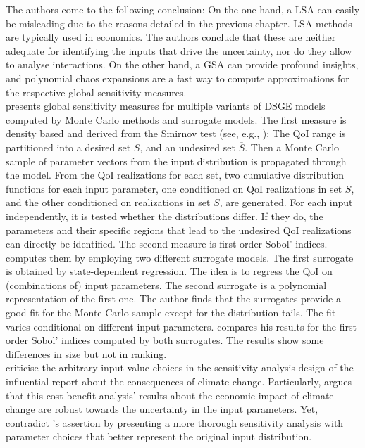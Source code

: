\documentclass[a4paper,12pt]{article}
\begin{document}
The authors come to the following conclusion: On the one hand, a LSA can easily be misleading due to the reasons detailed in the previous chapter. LSA methods are typically used in economics. The authors conclude that these are neither adequate for identifying the inputs that drive the uncertainty, nor do they allow to analyse interactions. On the other hand, a GSA can provide profound insights, and polynomial chaos expansions are a fast way to compute approximations for the respective global sensitivity measures.\\
\newline
\cite{Ratto.2008} presents global sensitivity measures for multiple variants of DSGE models computed by Monte Carlo methods and surrogate models. The first measure is density based and derived from the Smirnov test (see, e.g., \cite{Hornberger.1981}): The QoI range is partitioned into a desired set $S$, and an undesired set $\overline{S}$. Then a Monte Carlo sample of parameter vectors from the input distribution is propagated through the model. From the QoI realizations for each set, two cumulative distribution functions for each input parameter, one conditioned on QoI realizations in set $S$, and the other conditioned on realizations in set $\overline{S}$, are generated. For each input independently, it is tested whether the distributions differ. If they do, the parameters and their specific regions that lead to the undesired QoI realizations can directly be identified. The second measure is first-order Sobol' indices. \citeauthor{Ratto.2008} computes them by employing two different surrogate models. The first surrogate is obtained by state-dependent regression. The idea is to regress the QoI on (combinations of) input parameters. The second surrogate is a polynomial representation of the first one. The author finds that the surrogates provide a good fit for the Monte Carlo sample except for the distribution tails. The fit varies conditional on different input parameters. \citeauthor{Ratto.2008} compares his results for the first-order Sobol' indices computed by both surrogates. The results show some differences in size but not in ranking.\\
\newline
\cite{Saltelli.2010} criticise the arbitrary input value choices in the sensitivity analysis design of the influential \cite{Stern.2007} report about the consequences of climate change. Particularly, \citeauthor{Stern.2007} argues that this cost-benefit analysis' results about the economic impact of climate change are robust towards the uncertainty in the input parameters. Yet, \cite{Saltelli.2010} contradict \citeauthor{Stern.2007}'s assertion by presenting a more thorough sensitivity analysis with parameter choices that better represent the original input distribution.\\
\end{document}
